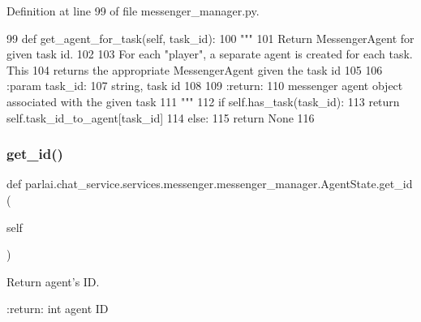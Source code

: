 Definition at line 99 of file messenger\+\_\+manager.\+py.


\begin{DoxyCode}
99     \textcolor{keyword}{def }get\_agent\_for\_task(self, task\_id):
100         \textcolor{stringliteral}{"""}
101 \textcolor{stringliteral}{        Return MessengerAgent for given task id.}
102 \textcolor{stringliteral}{}
103 \textcolor{stringliteral}{        For each "player", a separate agent is created for each task. This}
104 \textcolor{stringliteral}{        returns the appropriate MessengerAgent given the task id}
105 \textcolor{stringliteral}{}
106 \textcolor{stringliteral}{        :param task\_id:}
107 \textcolor{stringliteral}{            string, task id}
108 \textcolor{stringliteral}{}
109 \textcolor{stringliteral}{        :return:}
110 \textcolor{stringliteral}{            messenger agent object associated with the given task}
111 \textcolor{stringliteral}{        """}
112         \textcolor{keywordflow}{if} self.has\_task(task\_id):
113             \textcolor{keywordflow}{return} self.task\_id\_to\_agent[task\_id]
114         \textcolor{keywordflow}{else}:
115             \textcolor{keywordflow}{return} \textcolor{keywordtype}{None}
116 
\end{DoxyCode}
\mbox{\label{classparlai_1_1chat__service_1_1services_1_1messenger_1_1messenger__manager_1_1AgentState_aeb7f034a2bfe014172f0a5f127af2bae}} 
\subsubsection{\texorpdfstring{get\+\_\+id()}{get\_id()}}
{\footnotesize\ttfamily def parlai.\+chat\+\_\+service.\+services.\+messenger.\+messenger\+\_\+manager.\+Agent\+State.\+get\+\_\+id (\begin{DoxyParamCaption}\item[{}]{self }\end{DoxyParamCaption})}

\begin{DoxyVerb}Return agent's ID.

:return:
    int agent ID
\end{DoxyVerb}
 

